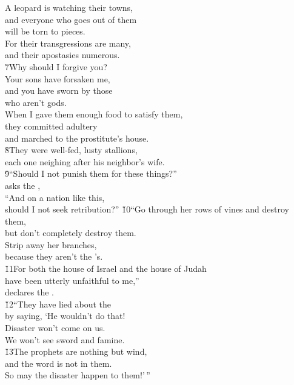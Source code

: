 \begin{poetry}
\poeml A leopard is watching their towns, \\
\poemll    and everyone who goes out of them \\
\poemlll       will be torn to pieces. \\
\poeml For their transgressions are many, \\
\poemll    and their apostasies numerous. \\
\poeml \v{7}Why should I forgive you? \\
\poemll    Your sons have forsaken me, \\
\poeml and you have sworn by those \\
\poemll    who aren't gods. \\
\poeml When I gave them enough food to satisfy them, \\
\poemll    they committed adultery \\
\poemll    and marched to the prostitute's house. \\
\poeml \v{8}They were well-fed, lusty stallions, \\
\poemll    each one neighing after his neighbor's wife. \\
\poeml \v{9}``Should I not punish them for these things?'' \\
\poemll    asks the , \\
\poeml ``And on a nation like this, \\
\poemll    should I not seek retribution?''
\poeml \v{10}``Go through her rows of vines and destroy them, \\
\poemll    but don't completely destroy them. \\
\poeml Strip away her branches, \\
\poemll    because they aren't the 's. \\
\poeml \v{11}For both the house of Israel and the house of Judah \\
\poemll    have been utterly unfaithful to me,'' \\
\poemlll       declares the . \\
\poeml \v{12}``They have lied about the  \\
\poemll    by saying, `He wouldn't do that! \\
\poeml Disaster won't come on us. \\
\poemll    We won't see sword and famine. \\
\poeml \v{13}The prophets are nothing but wind, \\
\poemll    and the word is not in them. \\
\poeml So may the disaster happen to them!'\,''
\end{poetry}


